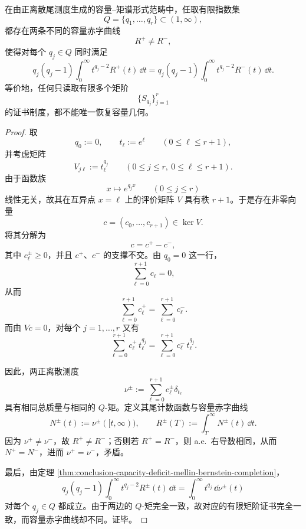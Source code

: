 \begin{theorem}[有限矩阶证书的不完备性]\label{thm:conclusion-finite-moment-certificate-incompleteness}
在由正离散尾测度生成的容量--矩谱形式范畴中，任取有限指数集
\[
Q=\{q_1,\dots,q_r\}\subset(1,\infty),
\]
都存在两条不同的容量赤字曲线
\[
R^+\neq R^-,
\]
使得对每个 \(q_j\in Q\) 同时满足
\[
q_j(q_j-1)\int_0^\infty t^{q_j-2}R^+(t)\,\dd t
=
q_j(q_j-1)\int_0^\infty t^{q_j-2}R^-(t)\,\dd t.
\]
等价地，任何只读取有限多个矩阶
\[
\{S_{q_j}\}_{j=1}^r
\]
的证书制度，都不能唯一恢复容量几何。
\end{theorem}
\begin{proof}
取
\[
q_0:=0,
\qquad
t_\ell:=e^\ell
\qquad(0\le \ell\le r+1),
\]
并考虑矩阵
\[
V_{j\ell}:=t_\ell^{q_j}
\qquad(0\le j\le r,\ 0\le \ell\le r+1).
\]
由于函数族
\[
x\longmapsto e^{q_jx}
\qquad(0\le j\le r)
\]
线性无关，故其在互异点 \(x=\ell\) 上的评价矩阵 \(V\) 具有秩 \(r+1\)。于是存在非零向量
\[
c=(c_0,\dots,c_{r+1})\in\ker V.
\]
将其分解为
\[
c=c^+-c^-,
\]
其中 \(c_\ell^\pm\ge 0\)，并且 \(c^+\)、\(c^-\) 的支撑不交。由 \(q_0=0\) 这一行，
\[
\sum_{\ell=0}^{r+1}c_\ell=0,
\]
从而
\[
\sum_{\ell=0}^{r+1}c_\ell^+=\sum_{\ell=0}^{r+1}c_\ell^-.
\]
而由 \(Vc=0\)，对每个 \(j=1,\dots,r\) 又有
\[
\sum_{\ell=0}^{r+1}c_\ell^+\,t_\ell^{q_j}
=
\sum_{\ell=0}^{r+1}c_\ell^-\,t_\ell^{q_j}.
\]

因此，两正离散测度
\[
\nu^\pm:=\sum_{\ell=0}^{r+1}c_\ell^\pm\delta_{t_\ell}
\]
具有相同总质量与相同的 \(Q\)-矩。定义其尾计数函数与容量赤字曲线
\[
N^\pm(t):=\nu^\pm([t,\infty)),
\qquad
R^\pm(T):=\int_T^\infty N^\pm(t)\,\dd t.
\]
因为 \(\nu^+\neq \nu^-\)，故 \(R^+\neq R^-\)；否则若 \(R^+=R^-\)，则 a.e.\ 右导数相同，从而 \(N^+=N^-\)，进而 \(\nu^+=\nu^-\)，矛盾。

最后，由定理 \ref{thm:conclusion-capacity-deficit-mellin-bernstein-completion}，
\[
q_j(q_j-1)\int_0^\infty t^{q_j-2}R^\pm(t)\,\dd t
=
\int_0^\infty t^{q_j}\,\dd\nu^\pm(t)
\]
对每个 \(q_j\in Q\) 都成立。由于两边的 \(Q\)-矩完全一致，故对应的有限矩阶证书完全一致，而容量赤字曲线却不同。证毕。
\end{proof}

